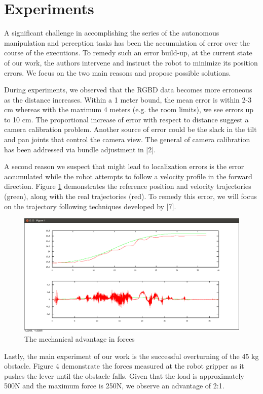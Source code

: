 \documentclass[runningheads,a4paper]{llncs}
\begin{document}
\section{Experiments}

A significant challenge in accomplishing the series of the autonomous manipulation and perception
tasks has been the accumulation of error over the course of the executions. To remedy such an error
build-up, at the current state of our work, the authors intervene and instruct the robot to minimize
its position errors. We focus on the two main reasons and propose possible solutions.

During experiments, we observed that the RGBD data becomes more erroneous as the distance increases.
Within a 1 meter bound, the mean error is within 2-3 cm whereas with the maximum 4 meters (e.g. the
room limits), we see errors up to 10 cm. The proportional increase of error with respect to distance
suggest a camera calibration problem. Another source of error could be the slack in the tilt and pan
joints that control the camera view. The general of camera calibration has been addressed via bundle
adjustment in [2].

A second reason we suspect that might lead to localization errors is the error accumulated while the
robot attempts to follow a velocity profile in the forward direction. Figure \ref{fig:controller} demonstrates the
reference position and velocity trajectories (green), along with the real trajectories (red). To
remedy this error, we will focus on the trajectory following techniques developed by [7].

\begin{figure}[ht!] 
  \centering
  \includegraphics[width=0.6\linewidth]{Figures/controller.png}
  \caption{The mechanical advantage in forces}
  \label{fig:controller}
\end{figure}

Lastly, the main experiment of our work is the successful overturning of the 45 kg obstacle. Figure
4 demonstrate the forces measured at the robot gripper as it pushes the lever until the obstacle
falls. Given that the load is approximately 500N and the maximum force is 250N, we observe an
advantage of 2:1.
\end{document}
